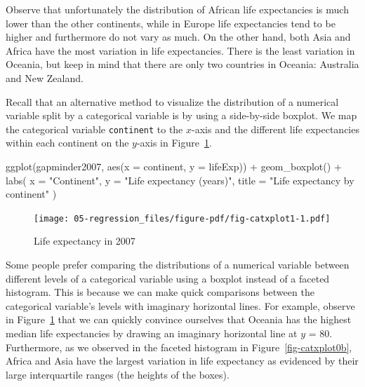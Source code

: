\documentclass[
  letterpaper,
  DIV=11,
  numbers=noendperiod]{scrreprt}
\newenvironment{Shaded}{\begin{snugshade}}{\end{snugshade}}
\newcommand{\AttributeTok}[1]{\textcolor[rgb]{0.40,0.45,0.13}{#1}}
\newcommand{\FunctionTok}[1]{\textcolor[rgb]{0.28,0.35,0.67}{#1}}
\newcommand{\NormalTok}[1]{\textcolor[rgb]{0.00,0.23,0.31}{#1}}
\newcommand{\SpecialCharTok}[1]{\textcolor[rgb]{0.37,0.37,0.37}{#1}}
\newcommand{\StringTok}[1]{\textcolor[rgb]{0.13,0.47,0.30}{#1}}
\theoremstyle{definition}
\theoremstyle{remark}
\begin{document}
Observe that unfortunately the distribution of African life expectancies
is much lower than the other continents, while in Europe life
expectancies tend to be higher and furthermore do not vary as much. On
the other hand, both Asia and Africa have the most variation in life
expectancies. There is the least variation in Oceania, but keep in mind
that there are only two countries in Oceania: Australia and New Zealand.

Recall that an alternative method to visualize the distribution of a
numerical variable split by a categorical variable is by using a
side-by-side boxplot. We map the categorical variable \texttt{continent}
to the \(x\)-axis and the different life expectancies within each
continent on the \(y\)-axis in Figure~\ref{fig-catxplot1}.

\begin{Shaded}
\begin{Highlighting}[]
\FunctionTok{ggplot}\NormalTok{(gapminder2007, }\FunctionTok{aes}\NormalTok{(}\AttributeTok{x =}\NormalTok{ continent, }\AttributeTok{y =}\NormalTok{ lifeExp)) }\SpecialCharTok{+}
  \FunctionTok{geom\_boxplot}\NormalTok{() }\SpecialCharTok{+}
  \FunctionTok{labs}\NormalTok{(}
    \AttributeTok{x =} \StringTok{"Continent"}\NormalTok{, }
    \AttributeTok{y =} \StringTok{"Life expectancy (years)"}\NormalTok{,}
    \AttributeTok{title =} \StringTok{"Life expectancy by continent"}
\NormalTok{    )}
\end{Highlighting}
\end{Shaded}

\begin{figure}[H]

{\centering \texttt{[image: 05-regression\_files/figure-pdf/fig-catxplot1-1.pdf]}

}

\caption{\label{fig-catxplot1}Life expectancy in 2007}

\end{figure}

Some people prefer comparing the distributions of a numerical variable
between different levels of a categorical variable using a boxplot
instead of a faceted histogram. This is because we can make quick
comparisons between the categorical variable's levels with imaginary
horizontal lines. For example, observe in Figure~\ref{fig-catxplot1}
that we can quickly convince ourselves that Oceania has the highest
median life expectancies by drawing an imaginary horizontal line at
\(y\) = 80. Furthermore, as we observed in the faceted histogram in
Figure~\ref{fig-catxplot0b}, Africa and Asia have the largest variation
in life expectancy as evidenced by their large interquartile ranges (the
heights of the boxes).
\end{document}

